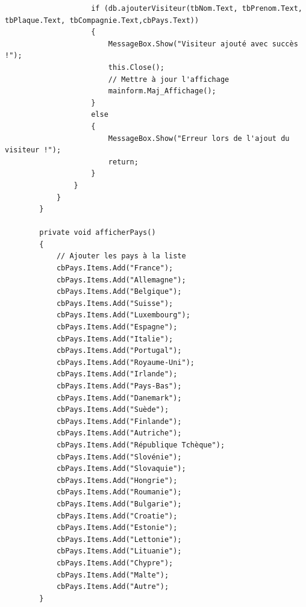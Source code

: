 \documentclass[main.tex]{subfiles}
\begin{document}
\begin{lstlisting}
                    if (db.ajouterVisiteur(tbNom.Text, tbPrenom.Text, tbPlaque.Text, tbCompagnie.Text,cbPays.Text))
                    {
                        MessageBox.Show("Visiteur ajouté avec succès !");
                        this.Close();
                        // Mettre à jour l'affichage
                        mainform.Maj_Affichage();
                    }
                    else
                    {
                        MessageBox.Show("Erreur lors de l'ajout du visiteur !");
                        return;
                    }
                }
            }
        }

        private void afficherPays()
        {
            // Ajouter les pays à la liste
            cbPays.Items.Add("France");
            cbPays.Items.Add("Allemagne");
            cbPays.Items.Add("Belgique");
            cbPays.Items.Add("Suisse");
            cbPays.Items.Add("Luxembourg");
            cbPays.Items.Add("Espagne");
            cbPays.Items.Add("Italie");
            cbPays.Items.Add("Portugal");
            cbPays.Items.Add("Royaume-Uni");
            cbPays.Items.Add("Irlande");
            cbPays.Items.Add("Pays-Bas");
            cbPays.Items.Add("Danemark");
            cbPays.Items.Add("Suède");
            cbPays.Items.Add("Finlande");
            cbPays.Items.Add("Autriche");
            cbPays.Items.Add("République Tchèque");
            cbPays.Items.Add("Slovénie");
            cbPays.Items.Add("Slovaquie");
            cbPays.Items.Add("Hongrie");
            cbPays.Items.Add("Roumanie");
            cbPays.Items.Add("Bulgarie");
            cbPays.Items.Add("Croatie");
            cbPays.Items.Add("Estonie");
            cbPays.Items.Add("Lettonie");
            cbPays.Items.Add("Lituanie");
            cbPays.Items.Add("Chypre");
            cbPays.Items.Add("Malte");
            cbPays.Items.Add("Autre");
        }


\end{lstlisting}
\end{document}
